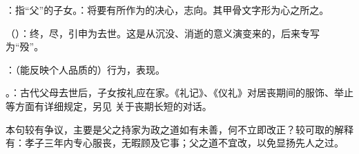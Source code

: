 {
\item {}：指“父”的子女。：将要有所作为的决心，志向。其甲骨文字形为心之所之。
\item {}（）：终，尽，引申为去世。这是从沉没、消逝的意义演变来的，后来专写为“殁”。
\item {}：（能反映个人品质的）行为，表现。
\item {}。：古代父母去世后，子女按礼应在家。《礼记》、《仪礼》对居丧期间的服饰、举止等方面有详细规定，另见  关于丧期长短的对话。

本句较有争议，主要是父之持家为政之道如有未善，何不立即改正？较可取的解释有：孝子三年内专心服丧，无暇顾及它事；父之道不宜改，以免显扬先人之过。
}
{}


